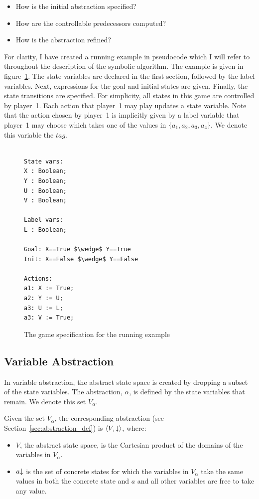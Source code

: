 \begin{itemize}
    \item How is the initial abstraction specified?
    \item How are the controllable predecessors computed?
    \item How is the abstraction refined?
\end{itemize}

For clarity, I have created a running example in pseudocode which I will refer to throughout the description of the symbolic algorithm. The example is given in figure~\ref{fig:running_example}. The state variables are declared in the first section, followed by the label variables. Next, expressions for the goal and initial states are given. Finally, the state transitions are specified. For simplicity, all states in this game are controlled by player~1. Each action that player~1 may play updates a state variable. Note that the action chosen by player~1 is implicitly given by a label variable that player~1 may choose which takes one of the values in $\{a_1, a_2, a_3, a_4\}$. We denote this variable the $tag$.

\begin{figure}
\begin{lstlisting}[mathescape]

State vars:
X : Boolean;
Y : Boolean;
U : Boolean;
V : Boolean;

Label vars:
L : Boolean;

Goal: X==True $\wedge$ Y==True
Init: X==False $\wedge$ Y==False

Actions:
a1: X := True;
a2: Y := U;
a3: U := L;
a3: V := True;

\end{lstlisting}
\caption{The game specification for the running example}
\label{fig:running_example}
\end{figure}

\subsection{Variable Abstraction}

In variable abstraction, the abstract state space is created by dropping a subset of the state variables. The abstraction, $\alpha$, is defined by the state variables that remain. We denote this set $V_{\alpha}$.

Given the set $V_{\alpha}$, the corresponding abstraction (see Section~\ref{sec:abstraction_def}) is $\langle V, \mathord{\downarrow} \rangle$, where:
\begin{itemize}
    \item $V$, the abstract state space, is the Cartesian product of the domains of the variables in $V_{\alpha}$.
    \item $a\mathord{\downarrow}$ is the set of concrete states for which the variables in $V_{\alpha}$ take the same values in both the concrete state and $a$ and all other variables are free to take any value.
\end{itemize}

